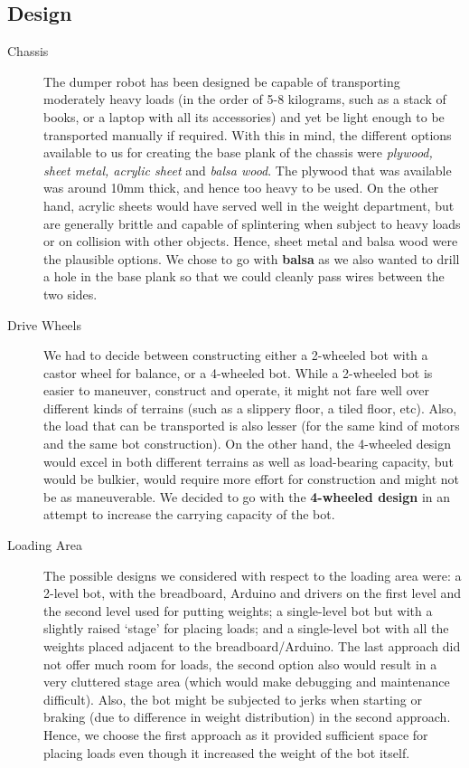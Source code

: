 \documentclass[a4paper]{article}
\begin{document}
\subsection{Design}

\begin{description}

\item[Chassis] The dumper robot has been designed be capable of transporting moderately heavy loads (in the order of 5-8 kilograms, such as a stack of books, or a laptop with all its accessories) and yet be light enough to be transported manually if required. With this in mind, the different options available to us for creating the base plank of the chassis were \textit{plywood, sheet metal, acrylic sheet} and \textit{balsa wood}. The plywood that was available was around 10mm thick, and hence too heavy to be used. On the other hand, acrylic sheets would have served well in the weight department, but are generally brittle and capable of splintering when subject to heavy loads or on collision with other objects. Hence, sheet metal and balsa wood were the plausible options. We chose to go with \textbf{balsa} as we also wanted to drill a hole in the base plank so that we could cleanly pass wires between the two sides.

\item[Drive Wheels] We had to decide between constructing either a 2-wheeled bot with a castor wheel for balance, or a 4-wheeled bot. While a 2-wheeled bot is easier to maneuver, construct and operate, it might not fare well over different kinds of terrains (such as a slippery floor, a tiled floor, etc). Also, the load that can be transported is also lesser (for the same kind of motors and the same bot construction). On the other hand, the 4-wheeled design would excel in both different terrains as well as load-bearing capacity, but would be bulkier, would require more effort for construction and might not be as maneuverable. We decided to go with the \textbf{4-wheeled design} in an attempt to increase the carrying capacity of the bot.

\item[Loading Area] The possible designs we considered with respect to the loading area were: a 2-level bot, with the breadboard, Arduino and drivers on the first level and the second level used for putting weights; a single-level bot but with a slightly raised `stage' for placing loads; and a single-level bot with all the weights placed adjacent to the breadboard/Arduino. The last approach did not offer much room for loads, the second option also would result in a very cluttered stage area (which would make debugging and maintenance difficult). Also, the bot might be subjected to jerks when starting or braking (due to difference in weight distribution) in the second approach. Hence, we choose the first approach as it provided sufficient space for placing loads even though it increased the weight of the bot itself.


\end{description}
\end{document}
